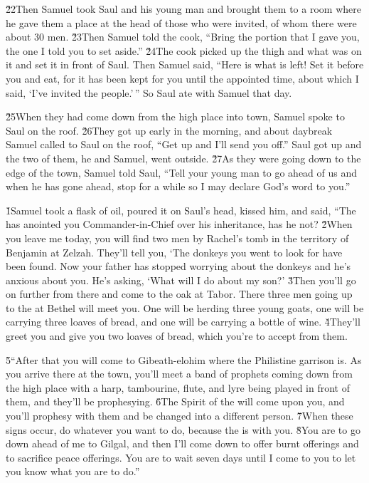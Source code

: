 \v{22}Then Samuel took Saul and his young man and brought them to a room where he gave them a place at the head of those who were invited, of whom there were about 30 men. \v{23}Then Samuel told the cook, ``Bring the portion that I gave you, the one I told you to set aside.'' \v{24}The cook picked up the thigh and what was on it and set it in front of Saul. Then Samuel said, ``Here is what is left! Set it before you and eat, for it has been kept for you until the appointed time, about which I said, `I've invited the people.'\,'' So Saul ate with Samuel that day.

\v{25}When they had come down from the high place into town, Samuel spoke to Saul on the roof. \v{26}They got up early in the morning, and about daybreak Samuel called to Saul on the roof, ``Get up and I'll send you off.'' Saul got up and the two of them, he and Samuel, went outside. \v{27}As they were going down to the edge of the town, Samuel told Saul, ``Tell your young man to go ahead of us and when he has gone ahead, stop for a while so I may declare God's word to you.''

\v{1}Samuel took a flask of oil, poured it on Saul's head, kissed him, and said, ``The  has anointed you Commander-in-Chief over his inheritance, has he not? \v{2}When you leave me today, you will find two men by Rachel's tomb in the territory of Benjamin at Zelzah. They'll tell you, `The donkeys you went to look for have been found. Now your father has stopped worrying about the donkeys and he's anxious about you. He's asking, `What will I do about my son?' \v{3}Then you'll go on further from there and come to the oak at Tabor. There three men going up to the  at Bethel will meet you. One will be herding three young goats, one will be carrying three loaves of bread, and one will be carrying a bottle of wine. \v{4}They'll greet you and give you two loaves of bread, which you're to accept from them.

\v{5}``After that you will come to Gibeath-elohim where the Philistine garrison is. As you arrive there at the town, you'll meet a band of prophets coming down from the high place with a harp, tambourine, flute, and lyre being played in front of them, and they'll be prophesying. \v{6}The Spirit of the  will come upon you, and you'll prophesy with them and be changed into a different person. \v{7}When these signs occur, do whatever you want to do, because the  is with you. \v{8}You are to go down ahead of me to Gilgal, and then I'll come down to offer burnt offerings and to sacrifice peace offerings. You are to wait seven days until I come to you to let you know what you are to do.''

